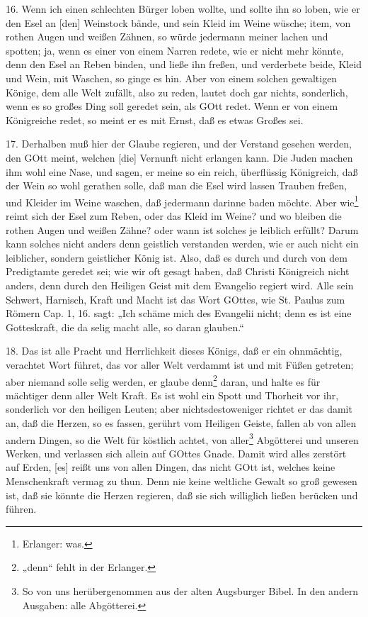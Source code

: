 16. Wenn ich einen schlechten Bürger loben wollte, und sollte ihn so loben, wie er den Esel an [den] Weinstock bände, und sein Kleid im Weine wüsche; item, von rothen Augen und weißen Zähnen, so würde jedermann meiner lachen und spotten; ja, wenn es einer von einem Narren redete, wie er nicht mehr könnte, denn den Esel an Reben binden, und ließe ihn freßen, und verderbete beide, Kleid und Wein, mit Waschen, so ginge es hin. Aber von einem solchen gewaltigen Könige, dem alle Welt zufällt, also zu reden, lautet doch gar nichts, sonderlich, wenn es so großes Ding soll geredet sein, als GOtt redet. Wenn er von einem Königreiche redet, so meint er es mit Ernst, daß es etwas Großes sei.

17. Derhalben muß hier der Glaube regieren, und der Verstand gesehen werden, den GOtt meint, welchen [die] Vernunft nicht erlangen kann. Die Juden machen ihm wohl eine Nase, und sagen, er meine so ein reich, überflüssig Königreich, daß der Wein so wohl gerathen solle, daß man die Esel wird lassen Trauben freßen, und Kleider im Weine waschen, daß jedermann darinne baden möchte. Aber wie\footnote{Erlanger: was.} reimt sich der Esel zum Reben, oder das Kleid im Weine? und wo bleiben die rothen Augen und weißen Zähne? oder wann ist solches je leiblich erfüllt? Darum kann solches nicht anders denn geistlich verstanden werden, wie er auch nicht ein leiblicher, sondern geistlicher König ist. Also, daß es durch und durch von dem Predigtamte geredet sei; wie wir oft gesagt haben, daß Christi Königreich nicht anders, denn durch den Heiligen Geist mit dem Evangelio regiert wird. Alle sein Schwert, Harnisch, Kraft und Macht ist das Wort GOttes, wie St. Paulus zum Römern Cap. 1, 16. sagt: „Ich schäme mich des Evangelii nicht; denn es ist eine Gotteskraft, die da selig macht alle, so daran glauben.“

18. Das ist alle Pracht und Herrlichkeit dieses Königs, daß er ein ohnmächtig, verachtet Wort führet, das vor aller Welt verdammt ist und mit Füßen getreten; aber niemand solle selig werden, er glaube denn\footnote{„denn“ fehlt in der Erlanger.} daran, und halte es für
mächtiger denn aller Welt Kraft. Es ist wohl ein Spott und Thorheit vor ihr, sonderlich vor den heiligen Leuten; aber nichtsdestoweniger richtet er das damit an, daß die Herzen, so es fassen, gerührt vom Heiligen Geiste, fallen ab von allen andern Dingen, so die Welt für köstlich achtet, von aller\footnote{So von uns herübergenommen aus der alten Augsburger Bibel. In den andern Ausgaben: alle Abgötterei.} Abgötterei und unseren Werken, und verlassen sich allein auf GOttes Gnade. Damit wird alles zerstört auf Erden, [es] reißt uns von allen Dingen, das nicht GOtt ist, welches keine Menschenkraft vermag zu thun. Denn nie keine weltliche Gewalt so groß gewesen ist, daß sie könnte die Herzen regieren, daß sie sich williglich ließen berücken und führen.

